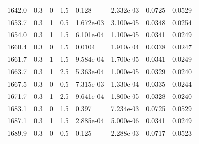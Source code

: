 \documentclass[preview]{standalone}
\begin{document}
{{{\begin{tabular}{L{1.2cm}C{1.2cm} C{0.3cm}C{0.5cm} C{1.4cm}C{1.4cm} C{1.4cm}C{1.4cm}}
  1642.0  &   0.3  & 0     & 1.5 &  0.128  & 2.332e-03  & 0.0725 &  0.0529   \\ 
  1653.7  &   0.3  & 1     & 0.5 &  1.672e-03  & 3.100e-05  & 0.0348 &  0.0254   \\ 
  1654.0  &   0.3  & 1     & 1.5 &  6.101e-04  & 1.100e-05  & 0.0341 &  0.0249   \\ 
  1660.4  &   0.3  & 0     & 1.5 &  0.0104  & 1.910e-04  & 0.0338 &  0.0247   \\ 
  1661.7  &   0.3  & 1     & 1.5 &  9.584e-04  & 1.700e-05  & 0.0341 &  0.0249   \\ 
  1663.7  &   0.3  & 1     & 2.5 &  5.363e-04  & 1.000e-05  & 0.0329 &  0.0240   \\ 
  1667.5  &   0.3  & 0     & 0.5 &  7.315e-03  & 1.330e-04  & 0.0335 &  0.0244   \\ 
  1671.7  &   0.3  & 1     & 2.5 &  9.641e-04  & 1.800e-05  & 0.0328 &  0.0240   \\ 
  1683.1  &   0.3  & 0     & 1.5 &  0.397  & 7.234e-03  & 0.0725 &  0.0529   \\ 
  1687.1  &   0.3  & 1     & 1.5 &  2.885e-04  & 5.000e-06  & 0.0341 &  0.0249   \\ 
  1689.9  &   0.3  & 0     & 0.5 &  0.125  & 2.288e-03  & 0.0717 &  0.0523   \\ 
\hline 
\end{tabular} 

}}}
\end{document}
